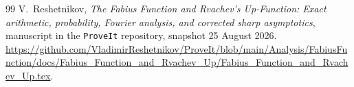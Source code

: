 \documentclass[11pt,oneside]{article}
\theoremstyle{definition}
\theoremstyle{remark}
\begin{document}
\begin{thebibliography}{99}
V.~Reshetnikov,
\newblock \emph{The Fabius Function and Rvachev's Up-Function: Exact arithmetic,
  probability, Fourier analysis, and corrected sharp asymptotics},
\newblock manuscript in the \texttt{ProveIt} repository, snapshot 25 August 2026.
\newblock \url{https://github.com/VladimirReshetnikov/ProveIt/blob/main/Analysis/FabiusFunction/docs/Fabius_Function_and_Rvachev_Up/Fabius_Function_and_Rvachev_Up.tex}.

\end{thebibliography}
\end{document}
